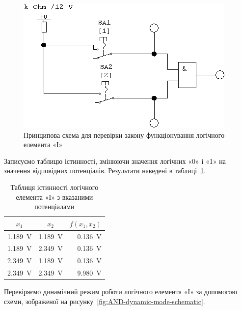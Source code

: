 \documentclass[a4paper,oneside,DIV=10,12pt]{scrartcl}
\begin{document}
			\begin{figure}[!htbp]
			\centering
				\includegraphics[]{schematics/02-01-AND.png}
			\caption{Принципова схема для перевірки закону функціонування логічного елемента «І»}
			\label{fig:AND-function-law-schematic}
			\end{figure}
			
			Записуємо таблицю істинності, змінюючи значення логічних «0» і «1» на значення відповідних потенціалів. Результати наведені в таблиці~\ref{fig:AND-truth-table-potentials}.
			
			\begin{table}[!htbp]
			\centering
				\begin{tabular}{ccr}
					\toprule
						$x_1$ & $x_2$ & $f(x_1, x_2)$\\
					\midrule
						\SI{1,189}{\volt} & \SI{1,189}{\volt} & \SI{0,136}{\volt}\\
						\SI{1,189}{\volt} & \SI{2,349}{\volt} & \SI{0,136}{\volt}\\
						\SI{2,349}{\volt} & \SI{1,189}{\volt} & \SI{0,136}{\volt}\\
						\SI{2,349}{\volt} & \SI{2,349}{\volt} & \SI{9,980}{\volt}\\
					\bottomrule
				\end{tabular}
			\caption{Таблиця істинності логічного елемента «І» з вказаними потенціалами}
			\label{fig:AND-truth-table-potentials}
			\end{table}
			
			Перевіряємо динамічний режим роботи логічного елемента «І» за допомогою схеми, зображеної на рисунку~\ref{fig:AND-dynamic-mode-schematic}.
			
\end{document}

